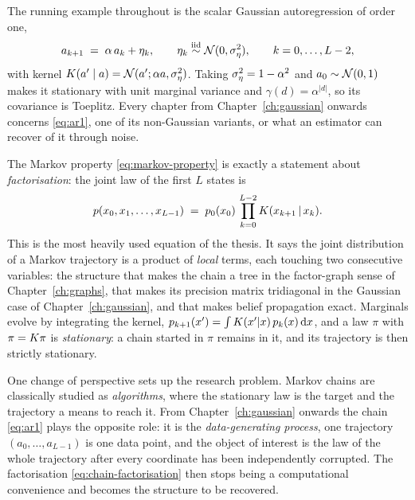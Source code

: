 \begin{example}\label{ex:ar1}
The running example throughout is the scalar Gaussian autoregression of order
one,
\begin{equation}
  a_{k+1} \;=\; \alpha\, a_k + \eta_k ,
  \qquad
  \eta_k \stackrel{\text{iid}}{\sim} \mathcal{N}(0, \sigma_\eta^2),
  \qquad k = 0, \dots, L-2 ,
  \label{eq:ar1}
\end{equation}
with kernel $K(a' \mid a) = \mathcal{N}(a'; \alpha a, \sigma_\eta^2)$. Taking
$\sigma_\eta^2 = 1 - \alpha^2$ and $a_0 \sim \mathcal{N}(0,1)$ makes it stationary with unit
marginal variance and $\gamma(d) = \alpha^{|d|}$, so its covariance is Toeplitz.
Every chapter from Chapter~\ref{ch:gaussian} onwards concerns \eqref{eq:ar1},
one of its non-Gaussian variants, or what an estimator can recover of it
through noise.
\end{example}

The Markov property \eqref{eq:markov-property} is exactly a statement about
\emph{factorisation}: the joint law of the first $L$ states is
\begin{equation}
  p(x_0, x_1, \dots, x_{L-1})
  \;=\; p_0(x_0)\, \prod_{k=0}^{L-2} K(x_{k+1} \,|\, x_k) .
  \label{eq:chain-factorisation}
\end{equation}
This is the most heavily used equation of the thesis. It says the joint
distribution of a Markov trajectory is a product of \emph{local} terms, each
touching two consecutive variables: the structure that makes the chain a tree
in the factor-graph sense of Chapter~\ref{ch:graphs}, that makes its precision
matrix tridiagonal in the Gaussian case of Chapter~\ref{ch:gaussian}, and that
makes belief propagation exact. Marginals evolve by integrating the kernel,
$p_{k+1}(x') = \int K(x'|x)\, p_k(x)\,\mathrm{d} x$, and a law $\pi$ with
$\pi = K \pi$ is \emph{stationary}: a chain started in $\pi$ remains in
it, and its trajectory is then strictly stationary.

One change of perspective sets up the research problem. Markov chains are
classically studied as \emph{algorithms}, where the stationary law is the target
and the trajectory a means to reach it. From Chapter~\ref{ch:gaussian} onwards
the chain \eqref{eq:ar1} plays the opposite role: it is the
\emph{data-generating process}, one trajectory $(a_0, \dots, a_{L-1})$ is one
data point, and the object of interest is the law of the whole trajectory after
every coordinate has been independently corrupted. The factorisation
\eqref{eq:chain-factorisation} then stops being a computational convenience and
becomes the structure to be recovered.

